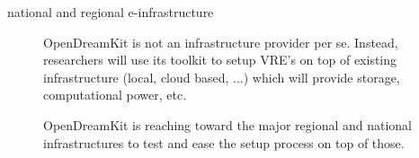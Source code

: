 \documentclass[12pta4wide]{amsart}
\begin{document}
\begin{description}
\begin{description}
  \item[national and regional e-infrastructure] OpenDreamKit is not an
    infrastructure provider per se. Instead, researchers will use its
    toolkit to setup VRE's on top of existing infrastructure (local,
    cloud based, ...) which will provide storage, computational power,
    etc.

    OpenDreamKit is reaching toward the major regional and national
    infrastructures to test and ease the setup process on top of
    those.
  \end{description}
\end{description}
\end{document}
